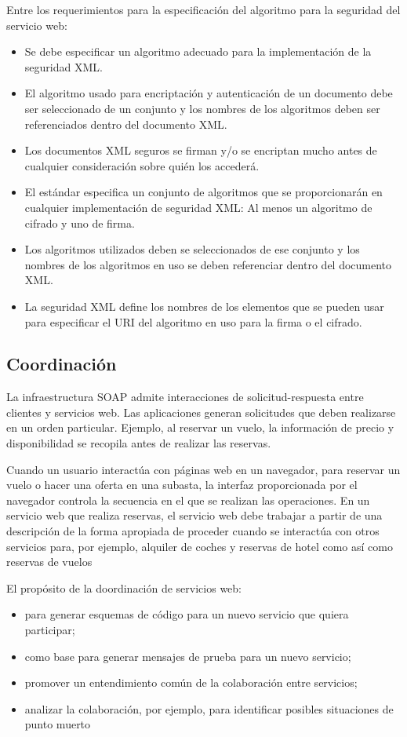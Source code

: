   	Entre los requerimientos para la especificaci\'on del algoritmo para la seguridad del servicio web:
	\begin{itemize} 
		\item Se debe especificar un algoritmo adecuado para la implementación de la seguridad XML.
		\item El algoritmo usado para encriptación y autenticación de un documento debe ser seleccionado de un conjunto y los nombres de los algoritmos deben ser referenciados dentro del documento XML.
		\item Los documentos XML seguros se firman y/o se encriptan mucho antes de cualquier consideración sobre quién los accederá. 
 			\item El estándar especifica un conjunto de algoritmos que se proporcionarán en cualquier implementación de seguridad XML: Al menos un algoritmo de cifrado y uno de firma.
			\item Los algoritmos utilizados deben se seleccionados de ese conjunto y los nombres de los algoritmos en uso se deben referenciar dentro del documento XML.
			\item La seguridad XML define los nombres de los elementos que se pueden usar para especificar el URI del algoritmo en uso para la firma o el cifrado.
		\end{itemize}


 \subsection{Coordinación}
 
 	  La infraestructura SOAP admite interacciones  de solicitud-respuesta entre clientes y servicios web.  Las aplicaciones  generan solicitudes que deben realizarse en un orden particular. 
 	 Ejemplo, al reservar un vuelo, la información de precio y disponibilidad se recopila antes de realizar las reservas. 
 
		 Cuando un usuario interactúa con páginas web en un navegador, para reservar un vuelo o hacer una oferta en una subasta, la interfaz proporcionada por el navegador controla la secuencia en el que se realizan las operaciones.
		 En un servicio web que realiza reservas, el servicio web debe trabajar a partir de una descripción de la forma apropiada de proceder cuando se interactúa con otros servicios para, por ejemplo, alquiler de coches y reservas de hotel como así como reservas de vuelos
 
 
 	El prop\'osito de la doordinación de servicios web:
	\begin{itemize} 
		\item para generar esquemas de código para un nuevo servicio que quiera participar;
		\item como base para generar mensajes de prueba para un nuevo servicio;
		\item promover un entendimiento común de la colaboración entre servicios;
		\item analizar la colaboración, por ejemplo, para identificar posibles situaciones de punto muerto
	\end{itemize}

